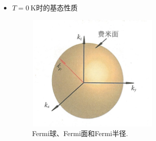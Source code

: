 \begin{itemize}
	\item $T=0~\mathrm{K}$时的基态性质
\begin{figure}[h!]
\centering
\vspace*{-0.10in}
\includegraphics[height=2.25in,width=2.55in,viewport=0 0 55 50,clip]{Figures/Fermi_Sphere.png}
\caption{\small \textrm{Fermi球、Fermi面和Fermi半径.}}%
\label{Fig:Fermi-sphere}
\end{figure}


\end{itemize}
